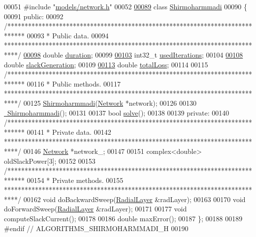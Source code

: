 \begin{DoxyCode}
00051 \textcolor{preprocessor}{#include "\hyperlink{network_8h}{models/network.h}"}
00052 
\hypertarget{shirmoharmmadi_8h_source_l00089}{}\hyperlink{class_shirmoharmmadi}{00089} \textcolor{keyword}{class }\hyperlink{class_shirmoharmmadi}{Shirmoharmmadi}
00090 \{
00091 \textcolor{keyword}{public}:
00092   \textcolor{comment}{/*****************************************************************************}
00093 \textcolor{comment}{   * Public data.}
00094 \textcolor{comment}{   ****************************************************************************/}
\hypertarget{shirmoharmmadi_8h_source_l00098}{}\hyperlink{class_shirmoharmmadi_a32ab19ff485833106bf68cd91dbc94e6}{00098}   \textcolor{keywordtype}{double} \hyperlink{class_shirmoharmmadi_a32ab19ff485833106bf68cd91dbc94e6}{duration};
00099 
\hypertarget{shirmoharmmadi_8h_source_l00103}{}\hyperlink{class_shirmoharmmadi_afdd22da0145b033c47f4f8a6bbd37d0d}{00103}   int32\_t \hyperlink{class_shirmoharmmadi_afdd22da0145b033c47f4f8a6bbd37d0d}{usedIterations};
00104 
\hypertarget{shirmoharmmadi_8h_source_l00108}{}\hyperlink{class_shirmoharmmadi_aeb47da6439c2e92c7ebcc59ebb71624b}{00108}   \textcolor{keywordtype}{double} \hyperlink{class_shirmoharmmadi_aeb47da6439c2e92c7ebcc59ebb71624b}{slackGeneration};
00109 
\hypertarget{shirmoharmmadi_8h_source_l00113}{}\hyperlink{class_shirmoharmmadi_a0c02ead0472b54a84fc746a13b8d02b2}{00113}   \textcolor{keywordtype}{double} \hyperlink{class_shirmoharmmadi_a0c02ead0472b54a84fc746a13b8d02b2}{totalLoss};
00114 
00115   \textcolor{comment}{/*****************************************************************************}
00116 \textcolor{comment}{   * Public methods.}
00117 \textcolor{comment}{   ****************************************************************************/}
00125   \hyperlink{group___algorithms_gaa5833386f9b43019a318c81a3006e2b1}{Shirmoharmmadi}(\hyperlink{class_network}{Network} *network);
00126 
00130   \hyperlink{group___algorithms_gac89016d70d3c99339af11f3b6f1f23b2}{~Shirmoharmmadi}();
00131 
00137   \textcolor{keywordtype}{bool} \hyperlink{group___algorithms_gacb4a06c62b5d97c25bea70acd477e715}{solve}();
00138 
00139 \textcolor{keyword}{private}:
00140   \textcolor{comment}{/*****************************************************************************}
00141 \textcolor{comment}{   * Private data.}
00142 \textcolor{comment}{   ****************************************************************************/}
00146   \hyperlink{class_network}{Network} *network\_;
00147 
00151   complex<double> oldSlackPower[3];
00152 
00153   \textcolor{comment}{/*****************************************************************************}
00154 \textcolor{comment}{   * Private methods.}
00155 \textcolor{comment}{   ****************************************************************************/}
00162   \textcolor{keywordtype}{void} doBackwardSweep(\hyperlink{class_radial_layer}{RadialLayer} &radLayer);
00163 
00170   \textcolor{keywordtype}{void} doForwardSweep(\hyperlink{class_radial_layer}{RadialLayer} &radLayer);
00171 
00177   \textcolor{keywordtype}{void} computeSlackCurrent();
00178 
00186   \textcolor{keywordtype}{double} maxError();
00187 \};
00188 
00189 \textcolor{preprocessor}{#endif // ALGORITHMS\_SHIRMOHARMMADI\_H}
00190 
\end{DoxyCode}
